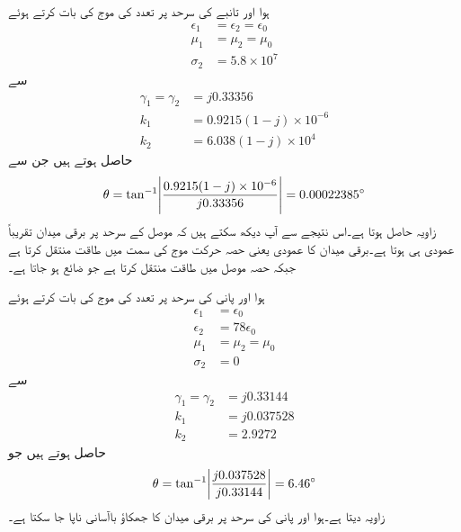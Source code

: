 ہوا اور تانبے کی سرحد پر  تعدد کی موج کی بات کرتے ہوئے
\begin{align*}
\epsilon_1&=\epsilon_2=\epsilon_0\\
\mu_1&=\mu_2=\mu_0\\
\sigma_2&=5.8\times 10^{7}
\end{align*}
سے
\begin{align*}
\gamma_1 =\gamma_2&= j 0.33356 \\
k_1&=0.9215(1-j) \times 10^{-6} \\
k_2&=6.038 (1-j)\times 10^4
\end{align*}
حاصل ہوتے ہیں جن سے
\begin{align*}
\theta=\tan^{-1} \abs{\frac{0.9215(1-j) \times 10^{-6}}{ j 0.33356}}=0.00022385^{\circ}
\end{align*}
زاویہ حاصل ہوتا  ہے۔اس نتیجے سے آپ دیکھ سکتے ہیں کہ موصل کے سرحد پر برقی میدان تقریباً عمودی ہی ہوتا ہے۔برقی میدان کا عمودی یعنی  حصہ حرکت موج کی سمت  میں طاقت منتقل کرتا ہے جبکہ  حصہ موصل میں طاقت منتقل کرتا ہے جو ضائع ہو جاتا ہے۔


ہوا اور پانی  کی سرحد پر  تعدد کی موج کی بات کرتے ہوئے
\begin{align*}
\epsilon_1&=\epsilon_0\\
\epsilon_2&=78 \epsilon_0\\
\mu_1&=\mu_2=\mu_0\\
\sigma_2&=0
\end{align*}
سے
\begin{align*}
\gamma_1 =\gamma_2&= j 0.33144 \\
k_1&=j 0.037528 \\
k_2&=2.9272
\end{align*}
حاصل ہوتے ہیں جو
\begin{align*}
\theta=\tan^{-1} \abs{\frac{j 0.037528 }{  j 0.33144}}=6.46^{\circ}
\end{align*}
زاویہ دیتا ہے۔ہوا اور پانی کی سرحد پر برقی میدان کا جھکاؤ باآسانی ناپا جا سکتا ہے۔

